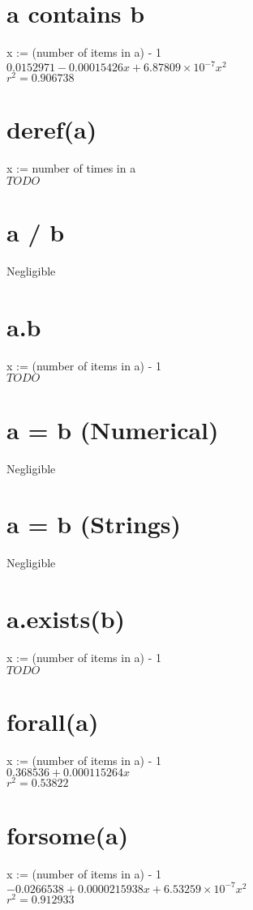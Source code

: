\documentclass[12pt]{article}
\begin{document}
	\section{a contains b}
	x := (number of items in a) - 1\\
	$0.0152971 - 0.00015426x + 6.87809 \times 10^{-7} x^2$\\
	$r^2 = 0.906738$
	
	\section{deref(a)}
	x := number of times in a\\
	$TODO$
	
	\section{a / b}
	Negligible
	
	\section{a.b}
	x := (number of items in a) - 1\\
	$TODO$
	
	\section{a = b (Numerical)}
	Negligible
	
	\section{a = b (Strings)}
	Negligible
	
	\section{a.exists(b)}
	x := (number of items in a) - 1\\
	$TODO$
	
	\section{forall(a)}
	x := (number of items in a) - 1\\
	$0.368536 + 0.000115264 x$\\
	$r^2 = 0.53822$
	
	\section{forsome(a)}
	x := (number of items in a) - 1\\
	$-0.0266538 + 0.0000215938 x + 6.53259 \times 10^{-7} x^2$\\
	$r^2 = 0.912933$
	
\end{document}
